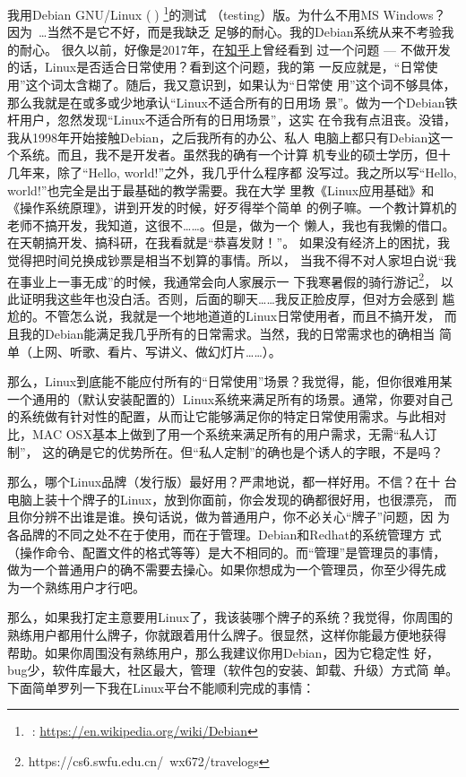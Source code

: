 我用Debian GNU/Linux ()%
\footnote{: \url{https://en.wikipedia.org/wiki/Debian}}的测试
（testing）版。为什么不用MS Windows？ 因为~\ldots 当然不是它不好，而是我缺乏
足够的耐心。我的Debian系统从来不考验我的耐心。
很久以前，好像是2017年，在\href{https://www.zhihu.com}{知乎}上曾经看到
过一个问题 --- 不做开发的话，Linux是否适合日常使用？看到这个问题，我的第
一反应就是，“日常使用”这个词太含糊了。随后，我又意识到，如果认为“日常使
用”这个词不够具体，那么我就是在或多或少地承认“Linux不适合所有的日用场
景”。做为一个Debian铁杆用户，忽然发现“Linux不适合所有的日用场景”，这实
在令我有点沮丧。没错，我从1998年开始接触Debian，之后我所有的办公、私人
电脑上都只有Debian这一个系统。而且，我不是开发者。虽然我的确有一个计算
机专业的硕士学历，但十几年来，除了“Hello, world!”之外，我几乎什么程序都
没写过。我之所以写“Hello, world!”也完全是出于最基础的教学需要。我在大学
里教《Linux应用基础》和《操作系统原理》，讲到开发的时候，好歹得举个简单
的例子嘛。一个教计算机的老师不搞开发，我知道，这很不……。但是，做为一个
懒人，我也有我懒的借口。在天朝搞开发、搞科研，在我看就是“恭喜发财！”。
如果没有经济上的困扰，我觉得把时间兑换成钞票是相当不划算的事情。所以，
当我不得不对人家坦白说“我在事业上一事无成”的时候，我通常会向人家展示一
下我寒暑假的骑行游记\footnote{https://cs6.swfu.edu.cn/~wx672/travelogs}，%
以此证明我这些年也没白活。否则，后面的聊天……我反正脸皮厚，但对方会感到
尴尬的。不管怎么说，我就是一个地地道道的Linux日常使用者，而且不搞开发，
而且我的Debian能满足我几乎所有的日常需求。当然，我的日常需求也的确相当
简单（上网、听歌、看片、写讲义、做幻灯片……）。

那么，Linux到底能不能应付所有的“日常使用”场景？我觉得，能，但你很难用某
一个通用的（默认安装配置的）Linux系统来满足所有的场景。通常，你要对自己
的系统做有针对性的配置，从而让它能够满足你的特定日常使用需求。与此相对
比，MAC OSX基本上做到了用一个系统来满足所有的用户需求，无需“私人订制”，
这的确是它的优势所在。但“私人定制”的确也是个诱人的字眼，不是吗？

那么，哪个Linux品牌（发行版）最好用？严肃地说，都一样好用。不信？在十
台电脑上装十个牌子的Linux，放到你面前，你会发现的确都很好用，也很漂亮，
而且你分辨不出谁是谁。换句话说，做为普通用户，你不必关心“牌子”问题，因
为各品牌的不同之处不在于使用，而在于管理。Debian和Redhat的系统管理方
式（操作命令、配置文件的格式等等）是大不相同的。而“管理”是管理员的事情，
做为一个普通用户的确不需要去操心。如果你想成为一个管理员，你至少得先成
为一个熟练用户才行吧。

那么，如果我打定主意要用Linux了，我该装哪个牌子的系统？我觉得，你周围的
熟练用户都用什么牌子，你就跟着用什么牌子。很显然，这样你能最方便地获得
帮助。如果你周围没有熟练用户，那么我建议你用Debian，因为它稳定性
好，bug少，软件库最大，社区最大，管理（软件包的安装、卸载、升级）方式简
单。下面简单罗列一下我在Linux平台不能顺利完成的事情：

